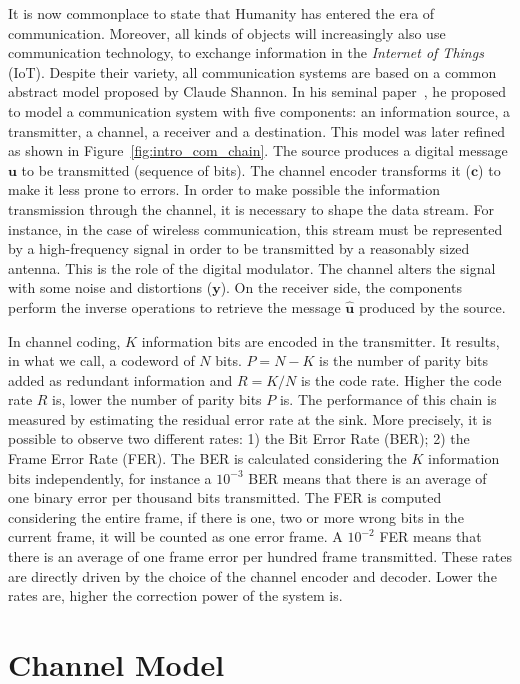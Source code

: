 It is now commonplace to state that Humanity has entered the era of
communication. Moreover, all kinds of objects will increasingly also use
communication technology, to exchange information in the \emph{Internet of
Things} (IoT). Despite their variety, all communication systems are based on a
common abstract model proposed by Claude Shannon. In his seminal
paper~\cite{Shannon1948}, he proposed to model a communication system with five
components: an information source, a transmitter, a channel, a receiver and a
destination. This model was later refined as shown in
Figure~\ref{fig:intro_com_chain}. The source produces a digital message $\bm{u}$
to be transmitted (sequence of bits). The channel encoder transforms it
($\bm{c}$) to make it less prone to errors. In order to make possible the
information transmission through the channel, it is necessary to shape the data
stream. For instance, in the case of wireless communication, this stream must be
represented by a high-frequency signal in order to be transmitted by a
reasonably sized antenna. This is the role of the digital modulator. The channel
alters the signal with some noise and distortions ($\bm{y}$). On the receiver
side, the components perform the inverse operations to retrieve the message
$\bm{\hat{u}}$ produced by the source.

In channel coding, $K$ information bits are encoded in the transmitter. It
results, in what we call, a codeword of $N$ bits. $P = N - K$ is the number of
parity bits added as redundant information and $R = K/N$ is the code rate.
Higher the code rate $R$ is, lower the number of parity bits $P$ is.
The performance of this chain is measured by estimating the residual error rate
at the sink. More precisely, it is possible to observe two different rates: 1)
the Bit Error Rate (BER); 2) the Frame Error Rate (FER). The BER is calculated
considering the $K$ information bits independently, for instance a $10^{-3}$
BER means that there is an average of one binary error per thousand bits
transmitted. The FER is computed considering the entire frame, if there is one,
two or more wrong bits in the current frame, it will be counted as one error
frame. A $10^{-2}$ FER means that there is an average of one frame error per
hundred frame transmitted. These rates are directly driven by the choice of the
channel encoder and decoder. Lower the rates are, higher the correction power
of the system is.

\section{Channel Model}

